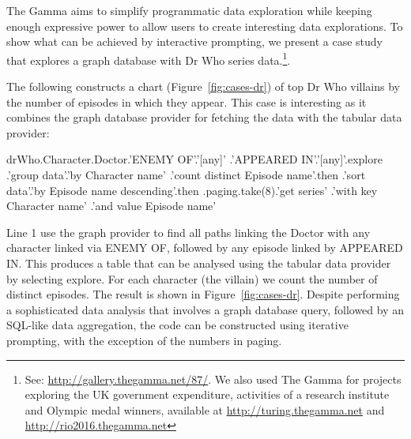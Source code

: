 \documentclass[conference]{IEEEtran}
\newcommand{\ikvd}[1]{{\fontfamily{zi4}\selectfont\small #1}}
\begin{document}
\noindent
The Gamma aims to simplify programmatic data exploration while keeping enough expressive power
to allow users to create interesting data explorations. To show what can be achieved by
interactive prompting, we present a case study that explores a graph database with Dr Who
series data.\footnote{See: \url{http://gallery.thegamma.net/87/}. We also used The Gamma for
projects exploring the UK government expenditure, activities of a research institute and Olympic
medal winners, available at \url{http://turing.thegamma.net} and \url{http://rio2016.thegamma.net}}.

The following constructs a chart (Figure~\ref{fig:cases-dr}) of top Dr Who villains by the number of
episodes in which they appear. This case is interesting as it combines the graph database provider
for fetching the data with the tabular data provider:

\vspace{0.25em}
\begin{thegamma}
drWho.Character.Doctor.'ENEMY OF'.'[any]'
     .'APPEARED IN'.'[any]'.explore
  .'group data'.'by Character name'
     .'count distinct Episode name'.then
  .'sort data'.'by Episode name descending'.then
  .paging.take(8).'get series'
     .'with key Character name'
     .'and value Episode name'
\end{thegamma}
\vspace{0.25em}

\noindent
Line 1 use the graph provider to find all paths linking the Doctor with any
character linked via \ikvd{ENEMY OF}, followed by any episode linked by \ikvd{APPEARED IN}.
This produces a table that can be analysed using the tabular data provider by selecting
\ikvd{explore}. For each character (the villain) we count the number of
distinct episodes. The result is shown in Figure~\ref{fig:cases-dr}.
Despite performing a sophisticated data analysis that involves a graph database query,
followed by an SQL-like data aggregation, the code can be constructed using iterative
prompting, with the exception of the numbers in paging.


\end{document}
